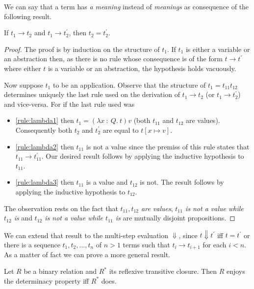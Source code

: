 We can say that a term has \emph{a meaning}  instead of \emph{meanings} as consequence of the following result. 

\begin{lemma}  If $t_1 \to t_2$ and $t_1 \to t^{'}_2$, then $t_2 = t^{'}_2$. 
\end{lemma}
\begin{proof}
The proof is by induction on the structure of $t_1$. If $t_1$ is either a variable or an abstraction then, as there is no rule whose consequence is of the form $t \to t^{'}$ where either $t$ is a variable or an abstraction, the hypothesis holds vacuously. 

Now suppose $t_1$ to be an application. Observe that the structure of $t_1 = t_{11}t_{12}$ determines uniquely the last rule used on the derivation of $t_1 \to t_2$ (or $t_1 \to t^{'}_2$) and vice-versa. For if the last rule used was  
\begin{itemize}
\item \eqref{rule:lambda1} then $t_1 =  (\lambda x \ : \ Q. \ t)v$ (both $t_{11}$ and $t_{12}$ are values). Consequently both $t_2$ and $t^{'}_2$ are equal to $t[x \mapsto v]$. 
\item \eqref{rule:lambda2} then $t_{11}$ is not a value since the premiss of this rule states that $t_{11} \to t^{'}_{11}$. Our desired result follows by applying the inductive hypothesis to $t_{11}$. 
\item \eqref{rule:lambda3} then $t_{11}$ is a value and $t_{12}$ is not. The result follows by applying the inductive hypothesis to $t_{12}$.
\end{itemize}
The observation rests on the fact that \emph{ $t_{11}, t_{12}$ are values}, \emph{$t_{11}$ is not a value while $t_{12}$ is} and \emph{$t_{12}$ is not a value while $t_{11}$ is} are mutually disjoint propositions.
\end{proof} 

We can extend that result to the multi-step evaluation $\Downarrow$, since $t \Downarrow t^{'}$ iff $t = t^{'}$ or there is a sequence $t_1, t_2, \ldots, t_n$ of $n > 1$ terms such that $t_i \to t_{i+1}$ for each $i < n$.  As a matter of fact we can prove a more general result. 

\begin{lemma}  \label{lemma:determinacy-rtc} Let $R$ be a binary relation and $R^{*}$ its reflexive transitive closure. Then $R$ enjoys the determinacy property iff $R^{*}$ does. 
\end{lemma} 


